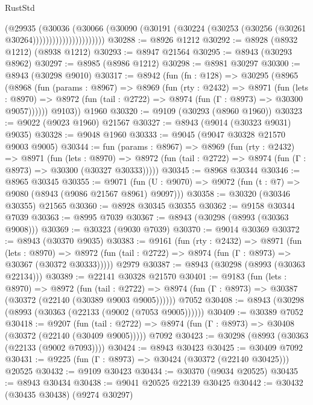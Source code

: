 \begin{lexlean}{RustStd}
\begin{coremodule}
{\begin{coremodule}
{{{{{{{{{{{{{{{{{{{{{{{{{{{{{{{{{{{{{{{                              (@29935
                                (@30036
                                  (@30066
                                    (@30090
                                      (@30191
                                        (@30224 (@30253 (@30256 (@30261 @30264))))))))))))))))))))))
@30288 := @8926 @1212
@30292 := @8928 (@8932 @1212) (@8938 @1212)
@30293 := @8947 @21564
@30295 := @8943 (@30293 @8962)
@30297 := @8985 (@8986 @1212)
@30298 := @8981 @30297
@30300 := @8943 (@30298 @9010)
@30317 := @8942
    (fun (fn : @128) =>
    @30295
      (@8965
        (@8968
          (fun (params : @8967) =>
          @8969
            (fun (rty : @2432) =>
            @8971
              (fun (lets : @8970) =>
              @8972 (fun (tail : @2722) => @8974 (fun (Γ : @8973) => @30300 @9057))))))
        @9103))
    @1960
@30320 := @9109 (@30293 (@8960 @1960))
@30323 := @9022 (@9023 @1960) @21567
@30327 := @8943 (@9014 (@30323 @9031) @9035)
@30328 := @9048 @1960
@30333 := @9045 (@9047 @30328 @21570 @9003 @9005)
@30344 := fun (params : @8967) =>
  @8969
    (fun (rty : @2432) =>
    @8971
      (fun (lets : @8970) =>
      @8972 (fun (tail : @2722) => @8974 (fun (Γ : @8973) => @30300 (@30327 @30333)))))
@30345 := @8968 @30344
@30346 := @8965 @30345
@30355 := @9071
    (fun (U : @9070) => @9072 (fun (t : @7) => @9080 (@8943 (@9086 @21567 @8961) @9097)))
@30358 := @30320 (@30346 @30355) @21565
@30360 := @8928 @30345 @30355
@30362 := @9158 @30344 @7039
@30363 := @8995 @7039
@30367 := @8943 (@30298 (@8993 (@30363 @9008)))
@30369 := @30323 (@9030 @7039)
@30370 := @9014 @30369
@30372 := @8943 (@30370 @9035)
@30383 := @9161
    (fun (rty : @2432) =>
    @8971
      (fun (lets : @8970) =>
      @8972 (fun (tail : @2722) => @8974 (fun (Γ : @8973) => @30367 (@30372 @30333)))))
    @2979
@30387 := @8943 (@30298 (@8993 (@30363 @22134)))
@30389 := @22141 @30328 @21570
@30401 := @9183
    (fun (lets : @8970) =>
    @8972
      (fun (tail : @2722) =>
      @8974 (fun (Γ : @8973) => @30387 (@30372 (@22140 (@30389 @9003 @9005))))))
    @7052
@30408 := @8943 (@30298 (@8993 (@30363 (@22133 (@9002 (@7053 @9005))))))
@30409 := @30389 @7052
@30418 := @9207
    (fun (tail : @2722) => @8974 (fun (Γ : @8973) => @30408 (@30372 (@22140 (@30409 @9005)))))
    @7092
@30423 := @30298 (@8993 (@30363 (@22133 (@9002 @7093))))
@30424 := @8943 @30423
@30425 := @30409 @7092
@30431 := @9225 (fun (Γ : @8973) => @30424 (@30372 (@22140 @30425))) @20525
@30432 := @9109 @30423
@30434 := @30370 (@9034 @20525)
@30435 := @8943 @30434
@30438 := @9041 @20525 @22139 @30425
@30442 := @30432 (@30435 @30438) (@9274 @30297)
}}}}}}}}}}}}}}}}}}}}}}}}}}}}}}}}}}}}}}}
\end{coremodule}}
\end{coremodule}
\end{lexlean}
